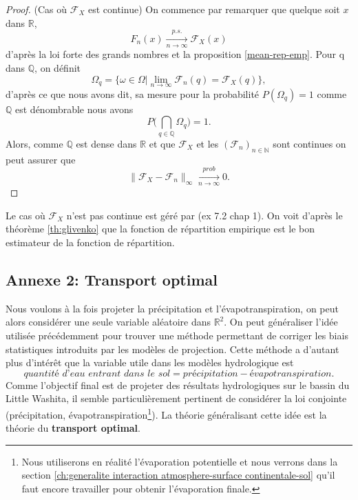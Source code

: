 \documentclass[a4paper,11pt]{article}
\numberwithin{equation}{section}
\begin{document}
\begin{proof} (Cas où $\mathcal{F}_X$ est continue)
	On commence par remarquer que quelque soit $x$ dans $\mathbb{R}$, \[F_{n}(x)\xrightarrow[n\to \infty]{p.s.}\mathcal{F}_X(x)\] d'après la loi forte des grands nombres et la proposition \eqref{mean-rep-emp}. Pour q dans $\mathbb{Q}$, on définit 
	\[\Omega_{q}=\{\omega \in \Omega | \lim_{n \to \infty} \mathcal{F}_{n}(q)=\mathcal{F}_X(q)\},\]
	d'après ce que nous avons dit, sa mesure pour la probabilité $P(\Omega_q)=1$ comme $\mathbb{Q}$ est dénombrable nous avons  
	\[P\Big(\bigcap_{q \in \mathbb{Q}} \Omega_q \Big)=1.\]
	Alors, comme $\mathbb{Q}$ est dense dans $\mathbb{R}$ et que $\mathcal{F}_{X}$ et les $(\mathcal{F}_n)_{n \in \mathbb{N}}$ sont continues on peut assurer que   
	\[	\|\mathcal{F}_{X}-\mathcal{F}_{n}\|_{\infty} \xrightarrow[n\to \infty]{prob} 0. \]
\end{proof}
Le cas où $\mathcal{F}_{X}$ n'est pas continue est géré par \cite{durrett2019probability} (ex 7.2 chap 1). On voit d'après le théorème \ref{th:glivenko} que la fonction de répartition empirique est le bon estimateur de la fonction de répartition. 

\subsection{Annexe 2: Transport optimal}
\label{ch:transport-optimal}

Nous voulons à la fois projeter la précipitation et l'évapotranspiration, on peut alors considérer une seule variable aléatoire dans $\mathbb{R}^2$. On peut généraliser l'idée utilisée précédemment pour trouver une méthode permettant de corriger les biais statistiques introduits par les modèles de projection. Cette méthode a d'autant plus d'intérêt que la variable utile dans les modèles hydrologique est 
\begin{equation}
	\label{eq-Qin-pr-etp}
	\textit{quantité d'eau entrant dans le sol}=\textit{précipitation}-\textit{évapotranspiration}.
\end{equation}
Comme l'objectif final est de projeter des résultats hydrologiques sur le bassin du Little Washita, il semble particulièrement pertinent de considérer la loi conjointe (précipitation, évapotranspiration\footnote{Nous utiliserons en réalité l'évaporation potentielle et nous verrons dans la section \ref{ch:generalite interaction atmosphere-surface continentale-sol} qu'il faut encore travailler pour obtenir l'évaporation finale.}). La théorie généralisant cette idée est la théorie du \textbf{transport optimal}.
\end{document}
